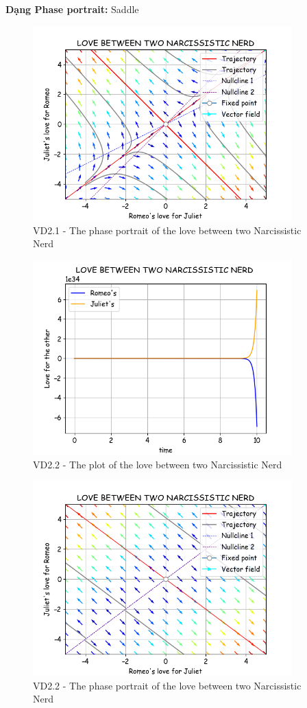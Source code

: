 \textbf{Dạng Phase portrait: } Saddle
\begin{figure}[!htbp]
    \centering
    \includegraphics[width=100mm]{image/bt2/pp2.1.png}
    \caption{VD2.1 - The phase portrait of the love between two Narcissistic Nerd}
\end{figure}
\pagebreak
\begin{figure}[!htbp]
    \centering
    \includegraphics[width=100mm]{image/bt2/plot2.2.png}
    \caption{VD2.2 - The plot of the love between two Narcissistic Nerd}
\end{figure}
\begin{figure}[!htbp]
    \centering
    \includegraphics[width=100mm]{image/bt2/pp2.2.png}
    \caption{VD2.2 - The phase portrait of the love between two Narcissistic Nerd}
\end{figure}

